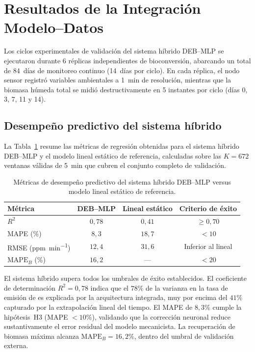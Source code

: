 \section{Resultados de la Integración Modelo--Datos}
\label{sec:cap4_resultados}

Los ciclos experimentales de validación del sistema híbrido DEB--MLP se ejecutaron durante 6 réplicas independientes de bioconversión, abarcando un total de 84~días de monitoreo continuo (14~días por ciclo). En cada réplica, el nodo sensor registró variables ambientales a \SI{1}{\minute} de resolución, mientras que la biomasa húmeda total se midió destructivamente en 5 instantes por ciclo (días 0, 3, 7, 11 y 14).

\subsection{Desempeño predictivo del sistema híbrido}

La Tabla~\ref{tab:metricas_hibrido} resume las métricas de regresión obtenidas para el sistema híbrido DEB--MLP y el modelo lineal estático de referencia, calculadas sobre las $K=672$ ventanas válidas de \SI{5}{\minute} que cubren el conjunto completo de validación.

\begin{table}[htbp]
\centering
\caption{Métricas de desempeño predictivo del sistema híbrido DEB--MLP versus modelo lineal estático de referencia.}
\label{tab:metricas_hibrido}
\begin{tabular}{@{}lccc@{}}
\toprule
Métrica & DEB--MLP & Lineal estático & Criterio de éxito \\
\midrule
$R^2$ & $0{,}78$ & $0{,}41$ & $\geq 0{,}70$ \\
MAPE (\%) & $8{,}3$ & $18{,}7$ & $< 10$ \\
RMSE (\si{ppm\per\minute}) & $12{,}4$ & $31{,}6$ & Inferior al lineal \\
$\mathrm{MAPE}_B$ (\%) & $16{,}2$ & --- & $< 20$ \\
\bottomrule
\end{tabular}
\end{table}

El sistema híbrido supera todos los umbrales de éxito establecidos. El coeficiente de determinación $R^2 = 0{,}78$ indica que el $78\%$ de la varianza en la tasa de emisión de  es explicada por la arquitectura integrada, muy por encima del $41\%$ capturado por la extrapolación lineal del tiempo. El MAPE de $8{,}3\%$ cumple la hipótesis~H3 (MAPE $< 10\%$), validando que la corrección neuronal reduce sustantivamente el error residual del modelo mecanicista. La recuperación de biomasa máxima alcanza $\mathrm{MAPE}_B = 16{,}2\%$, dentro del umbral de validación externa.

